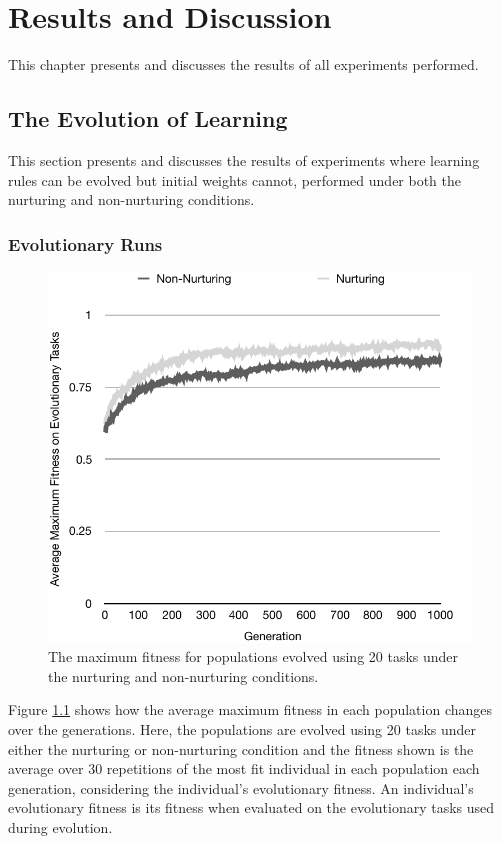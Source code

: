 \documentclass[master]{outhesis}
\begin{document}
\chapter{Results and Discussion}

This chapter presents and discusses the results of all experiments performed.

\section{The Evolution of Learning}

This section presents and discusses the results of experiments where learning rules can be evolved but initial weights cannot, performed under both the nurturing and non-nurturing conditions.

\subsection{Evolutionary Runs}

\begin{figure}[h]
	\centering
	\includegraphics{T1Evolution.pdf}
	\caption{The maximum fitness for populations evolved using 20 tasks under the nurturing and non-nurturing conditions.}
	\label{fig:T1Evolution}
\end{figure}

Figure \ref{fig:T1Evolution} shows how the average maximum fitness in each population changes over the generations.
Here,
the populations are evolved using 20 tasks under either the nurturing or non-nurturing condition
and the fitness shown is the average over 30 repetitions of the most fit individual in each population each generation,
considering the individual's evolutionary fitness.
An individual's evolutionary fitness is its fitness when evaluated on the evolutionary tasks used during evolution.
\end{document}
